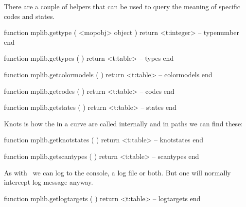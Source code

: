 \stopsubsection

\startsubsection[title=Internals]

There are a couple of helpers that can be used to query the meaning of specific
codes and states.

\starttyping[option=LUA]
function mplib.gettype ( <mopobj> object )
    return <t:integer> -- typenumber
end
\stoptyping

\starttyping[option=LUA]
function mplib.gettypes ( )
    return <t:table> -- types
end
\stoptyping

\startcolumns[n=4]
\stopcolumns

\starttyping[option=LUA]
function mplib.getcolormodels ( )
    return <t:table> -- colormodels
end
\stoptyping

\startcolumns[n=4]
\stopcolumns

\starttyping[option=LUA]
function mplib.getcodes ( )
    return <t:table> -- codes
end
\stoptyping

\startcolumns[n=4]
\stopcolumns

\starttyping[option=LUA]
function mplib.getstates ( )
    return <t:table> -- states
end
\stoptyping

\startcolumns[n=4]
\stopcolumns

Knots is how the  in a curve are called internally and in paths we
can find these:

\starttyping[option=LUA]
function mplib.getknotstates ( )
    return <t:table> -- knotstates
end
\stoptyping

\startcolumns[n=4]
\stopcolumns

\starttyping[option=LUA]
function mplib.getscantypes ( )
    return <t:table> -- scantypes
end
\stoptyping

\startcolumns[n=4]
\stopcolumns

As with \TEX\ we can log to the console, a log file or both. But one will normally
intercept log message anyway.

\starttyping[option=LUA]
function mplib.getlogtargets ( )
    return <t:table> -- logtargets
end
\stoptyping

\startcolumns[n=4]
\stopcolumns

